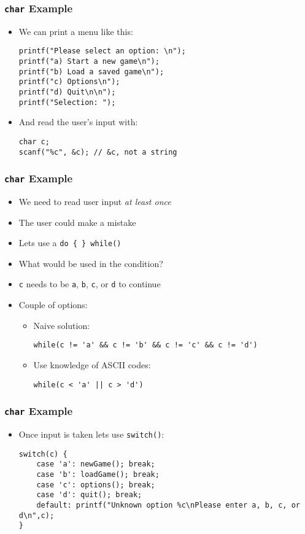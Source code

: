 \documentclass[14pt]{beamer}
\begin{document}
\begin{frame}[fragile]
\frametitle{\texttt{char} Example}
\begin{itemize}
\item We can print a menu like this:
\begin{lstlisting}[style=CStyle]
printf("Please select an option: \n");
printf("a) Start a new game\n");
printf("b) Load a saved game\n");
printf("c) Options\n");
printf("d) Quit\n\n");
printf("Selection: ");
\end{lstlisting}
\pause
\item And read the user's input with:
\begin{lstlisting}[style=CStyle]
char c;
scanf("%c", &c); // &c, not a string
\end{lstlisting}
\end{itemize}
\end{frame}

\begin{frame}[fragile]
\frametitle{\texttt{char} Example}
\begin{itemize}
\item We need to read user input \textit{at least once}
\item The user could make a mistake
\item Lets use a \texttt{do \{ \} while()}
\pause
\item What would be used in the condition?
\pause
\item \texttt{c} needs to be \texttt{a}, \texttt{b}, \texttt{c}, or \texttt{d} to continue
\pause
\item Couple of options:
	\begin{itemize}
		\item Naive solution:
\begin{lstlisting}[style=CStyle]
while(c != 'a' && c != 'b' && c != 'c' && c != 'd')
\end{lstlisting}
		\item Use knowledge of ASCII codes:
\begin{lstlisting}[style=CStyle]
while(c < 'a' || c > 'd')
\end{lstlisting}
	\end{itemize}
\end{itemize}
\end{frame}

\begin{frame}[fragile]
\frametitle{\texttt{char} Example}
\begin{itemize}
\item Once input is taken lets use \texttt{switch()}:
\begin{lstlisting}[style=CStyle]
switch(c) {
	case 'a': newGame(); break;
	case 'b': loadGame(); break;
	case 'c': options(); break;
	case 'd': quit(); break;
	default: printf("Unknown option %c\nPlease enter a, b, c, or d\n",c);
}
\end{lstlisting}
\end{itemize}
\end{frame}
\end{document}
